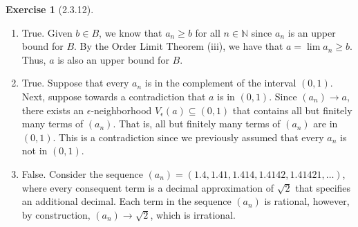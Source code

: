 \documentclass{amsart}
\theoremstyle{definition}
\newtheorem{exercise}{Exercise}
\newcommand{\N}{\mathbb{N}}
\begin{document}
\begin{exercise}[2.3.12]
  \begin{enumerate}[label={(\alph*)}]
    \item True. Given $b \in B$, we know that $a_n \ge b$ for all $n \in \N$
      since $a_n$ is an upper bound for $B$. By the Order Limit Theorem (iii),
      we have that $a = \lim{a_n} \ge b$. Thus, $a$ is also an upper bound for
      $B$.
    \item True. Suppose that every $a_n$ is in the complement of the interval
      $(0,1)$. Next, suppose towards a contradiction that $a$ is in $(0,1)$.
      Since $(a_n) \rightarrow a$, there exists an $\epsilon$-neighborhood
      $V_\epsilon(a) \subseteq (0,1)$ that contains all but finitely many terms
      of $(a_n)$. That is, all but finitely many terms of $(a_n)$ are in
      $(0,1)$. This is a contradiction since we previously assumed that every
      $a_n$ is not in $(0,1)$.
    \item False. Consider the sequence $(a_n) = (1.4, 1.41, 1.414, 1.4142,
      1.41421, \ldots)$, where every consequent term is a decimal approximation
      of $\sqrt{2}$ that specifies an additional decimal. Each term in the
      sequence $(a_n)$ is rational, however, by construction, $(a_n) \rightarrow
      \sqrt{2}$, which is irrational.
  \end{enumerate}
\end{exercise}
\end{document}
